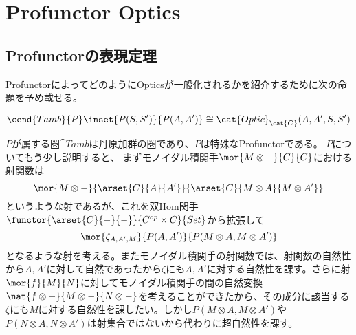 \documentclass[uplatex,dvipdfmx]{jsarticle}
\begin{document}
  \section{Profunctor Optics}
  \subsection{Profunctorの表現定理}
  ProfunctorによってどのようにOpticsが一般化されるかを紹介するために次の命題を予め載せる。
  \begin{prop}[Profunctorの表現可能定理]\label{prop-profunctor-representation-theorem}
    \[\cend{Tamb}{P}\inset{P(S,S')}{P(A,A')}\cong \cat{Optic}_\cat{C}(A,A',S,S')\]
  \end{prop}
  $P$が属する圏$\cat{Tamb}$は丹原加群の圏であり、$P$は特殊なProfunctorである。
  $P$についてもう少し説明すると、
  まずモノイダル積関手$\mor{M\otimes -}{C}{C}$における射関数は\[\mor{M\otimes -}{\arset{C}{A}{A'}}{\arset{C}{M\otimes A}{M\otimes A'}}\]というような射であるが、これを双Hom関手$\functor{\arset{C}{-}{-}}{C^{op}\times C}{Set}$から拡張して\[\mor{\zeta_{A,A',M}}{P(A,A')}{P(M\otimes A, M\otimes A')}\]となるような射を考える。またモノイダル積関手の射関数では、射関数の自然性から$A,A'$に対して自然であったから$\zeta$にも$A,A'$に対する自然性を課す。さらに射$\mor{f}{M}{N}$に対してモノイダル積関手の間の自然変換$\nat{f\otimes -}{M\otimes -}{N\otimes -}$を考えることができたから、その成分に該当する$\zeta$にも$M$に対する自然性を課したい。しかし$P(M\otimes A,M\otimes A')$や$P(N\otimes A, N\otimes A')$は射集合ではないから代わりに超自然性を課す。
\end{document}
